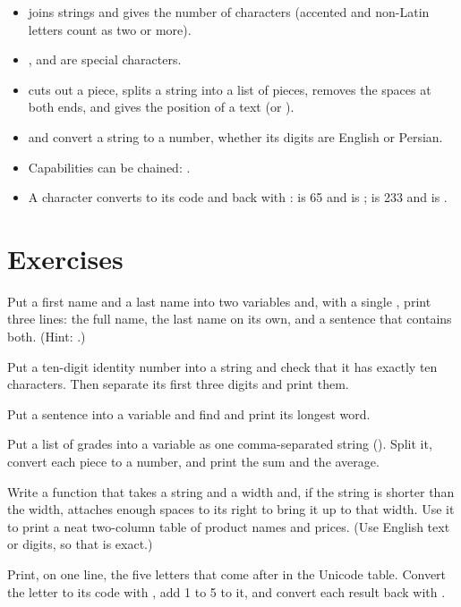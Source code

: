 \begin{summary}
\begin{itemize}
  \item \code{+} joins strings and  gives the number of
        characters (accented and non-Latin letters count as two or more).
  \item {},  and
         are special characters.
  \item {} cuts out a piece,
         splits a string into a list of pieces,
         removes the spaces at both ends, and
         gives the position of a text (or ).
  \item {} and  convert a string to a
        number, whether its digits are English or Persian.
  \item Capabilities can be chained: .
  \item A character converts to its code and back with :
         is 65 and  is ;
         is 233 and  is .
\end{itemize}
\end{summary}

\section*{Exercises}

\exercise Put a first name and a last name into two variables and, with a
single , print three lines: the full name, the last name on
its own, and a sentence that contains both. (Hint: .)

\exercise Put a ten-digit identity number into a string and check that it
has exactly ten characters. Then separate its first three digits and print
them.

\exercise Put a sentence into a variable and find and print its longest
word.

\exercise Put a list of grades into a variable as one comma-separated string
(). Split it, convert each piece to a number, and print
the sum and the average.

\exercise Write a function that takes a string and a width and, if the
string is shorter than the width, attaches enough spaces to its right to
bring it up to that width. Use it to print a neat two-column table of
product names and prices. (Use English text or digits, so that 
is exact.)

\exercise Print, on one line, the five letters that come after 
in the Unicode table. Convert the letter to its code with , add
1 to 5 to it, and convert each result back with .

